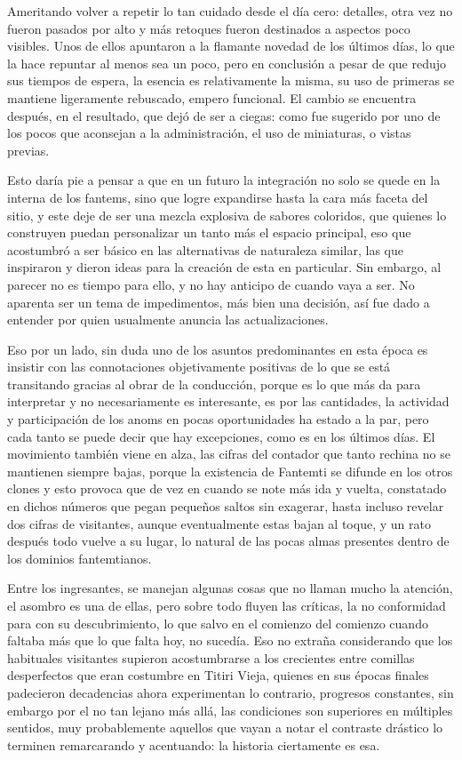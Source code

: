 \documentclass[
]{book}
\begin{document}
Ameritando volver a repetir lo tan cuidado desde el día cero: detalles, otra vez no fueron pasados por alto y más retoques fueron destinados a aspectos poco visibles. Unos de ellos apuntaron a la flamante novedad de los últimos días, lo que la hace repuntar al menos sea un poco, pero en conclusión a pesar de que redujo sus tiempos de espera, la esencia es relativamente la misma, su uso de primeras se mantiene ligeramente rebuscado, empero funcional. El cambio se encuentra después, en el resultado, que dejó de ser a ciegas: como fue sugerido por uno de los pocos que aconsejan a la administración, el uso de miniaturas, o vistas previas.

Esto daría pie a pensar a que en un futuro la integración no solo se quede en la interna de los fantems, sino que logre expandirse hasta la cara más faceta del sitio, y este deje de ser una mezcla explosiva de sabores coloridos, que quienes lo construyen puedan personalizar un tanto más el espacio principal, eso que acostumbró a ser básico en las alternativas de naturaleza similar, las que inspiraron y dieron ideas para la creación de esta en particular. Sin embargo, al parecer no es tiempo para ello, y no hay anticipo de cuando vaya a ser. No aparenta ser un tema de impedimentos, más bien una decisión, así fue dado a entender por quien usualmente anuncia las actualizaciones.

Eso por un lado, sin duda uno de los asuntos predominantes en esta época es insistir con las connotaciones objetivamente positivas de lo que se está transitando gracias al obrar de la conducción, porque es lo que más da para interpretar y no necesariamente es interesante, es por las cantidades, la actividad y participación de los anoms en pocas oportunidades ha estado a la par, pero cada tanto se puede decir que hay excepciones, como es en los últimos días. El movimiento también viene en alza, las cifras del contador que tanto rechina no se mantienen siempre bajas, porque la existencia de Fantemti se difunde en los otros clones y esto provoca que de vez en cuando se note más ida y vuelta, constatado en dichos números que pegan pequeños saltos sin exagerar, hasta incluso revelar dos cifras de visitantes, aunque eventualmente estas bajan al toque, y un rato después todo vuelve a su lugar, lo natural de las pocas almas presentes dentro de los dominios fantemtianos.

Entre los ingresantes, se manejan algunas cosas que no llaman mucho la atención, el asombro es una de ellas, pero sobre todo fluyen las críticas, la no conformidad para con su descubrimiento, lo que salvo en el comienzo del comienzo cuando faltaba más que lo que falta hoy, no sucedía. Eso no extraña considerando que los habituales visitantes supieron acostumbrarse a los crecientes entre comillas desperfectos que eran costumbre en Titiri Vieja, quienes en sus épocas finales padecieron decadencias ahora experimentan lo contrario, progresos constantes, sin embargo por el no tan lejano más allá, las condiciones son superiores en múltiples sentidos, muy probablemente aquellos que vayan a notar el contraste drástico lo terminen remarcarando y acentuando: la historia ciertamente es esa.
\end{document}
